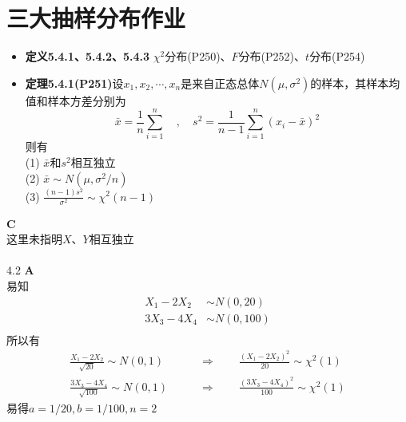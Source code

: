 \documentclass[a4paper]{ctexart}    %
\begin{document}
	\section{三大抽样分布作业}
	\begin{tcolorbox}
		[
		colframe=blue!25,
		colback=blue!10,
		coltitle=blue!20!black,  
		fonttitle=\bfseries,
		adjusted title=Formula Or Theorem:
		]
		\begin{itemize}
			\item \textbf{定义5.4.1、5.4.2、5.4.3} \quad $ \chi^2 $分布(P250)、$ F $分布(P252)、$ t $分布(P254)
			\item \textbf{定理5.4.1(P251)}设$ x_1, x_2, \cdots, x_n $是来自正态总体$ N(\mu, \sigma^2) $的样本，其样本均值和样本方差分别为
			\begin{equation*}
				\bar{x} = \frac{1}{n}\sum\limits_{i=1}^{n} \quad , \quad s^2 = \frac{1}{n-1}\sum\limits_{i=1}^{n}(x_i-\bar{x})^2
			\end{equation*}
			则有 \\
			(1) $ \bar{x} \text{和} s^2 \text{相互独立} $ \\
			(2) $ \bar{x} \sim N(\mu, \sigma^2/n) $ \\
			(3) $ \frac{(n-1)s^2}{\sigma^2} \sim \chi^2(n-1) $
		\end{itemize}
	\end{tcolorbox}
	 \quad\textbf{C}\\
	这里未指明$X$、$Y$相互独立\\
	\\
	4.2 \quad\textbf{A} \\
	易知
	\begin{equation*}
		\begin{split}
			X_1 - 2X_2 & \sim N(0, 20) \\
			3X_3 - 4X_4 & \sim N(0, 100) \\
		\end{split}
	\end{equation*}
	所以有
	\begin{equation*}
		\begin{split}
			\frac{X_1 - 2X_2}{\sqrt{20}} \sim N(0, 1) \qquad  &\Rightarrow\qquad \frac{(X_1 - 2X_2)^2}{20} \sim \chi^2(1) \\
			\frac{3X_3-4X_4}{\sqrt{100}} \sim N(0, 1) \qquad &\Rightarrow \qquad \frac{(3X_3-4X_4)^2}{100} \sim \chi^2(1)
		\end{split}
	\end{equation*}
	易得$ a = 1/20, b = 1/100, n = 2$\\
	\\
\end{document}
